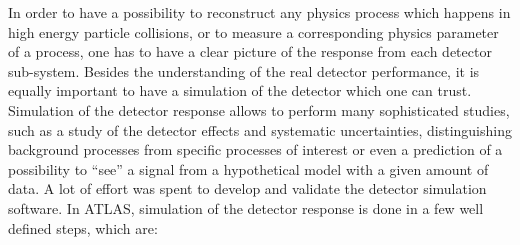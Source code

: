 In order to have a possibility to reconstruct any physics process which happens in high energy particle collisions, or to measure a corresponding physics parameter of a process,
one has to have a clear picture of the response from each detector sub-system. Besides the understanding of the real detector performance, it is equally important to have 
a simulation of the detector which one can trust. Simulation of the detector response allows to perform many sophisticated studies, such as a study of the detector effects and systematic uncertainties,
distinguishing background processes from specific processes of interest or even a prediction of a possibility to ``see'' a signal from a hypothetical model with a given amount of data.
A lot of effort was spent to develop and validate the detector simulation software. In ATLAS, simulation of the detector response is done in a few well defined steps, which are:
